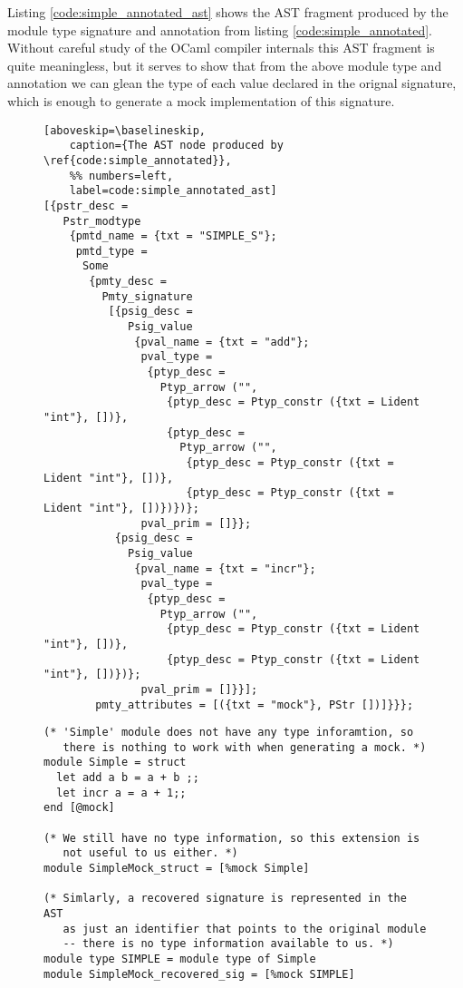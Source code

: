 Listing \ref{code:simple_annotated_ast} shows the AST fragment
produced by the module type signature and annotation from listing
\ref{code:simple_annotated}. Without careful study of the OCaml
compiler internals this AST fragment is quite meaningless, but it
serves to show that from the above module type and annotation we can
glean the type of each value declared in the orignal signature, which
is enough to generate a mock implementation of this signature.

\begin{figure}
\begin{lstlisting}[aboveskip=\baselineskip,
    caption={The AST node produced by \ref{code:simple_annotated}},
    %% numbers=left,
    label=code:simple_annotated_ast]
[{pstr_desc =
   Pstr_modtype
    {pmtd_name = {txt = "SIMPLE_S"};
     pmtd_type =
      Some
       {pmty_desc =
         Pmty_signature
          [{psig_desc =
             Psig_value
              {pval_name = {txt = "add"};
               pval_type =
                {ptyp_desc =
                  Ptyp_arrow ("",
                   {ptyp_desc = Ptyp_constr ({txt = Lident "int"}, [])},
                   {ptyp_desc =
                     Ptyp_arrow ("",
                      {ptyp_desc = Ptyp_constr ({txt = Lident "int"}, [])},
                      {ptyp_desc = Ptyp_constr ({txt = Lident "int"}, [])})})};
               pval_prim = []}};
           {psig_desc =
             Psig_value
              {pval_name = {txt = "incr"};
               pval_type =
                {ptyp_desc =
                  Ptyp_arrow ("",
                   {ptyp_desc = Ptyp_constr ({txt = Lident "int"}, [])},
                   {ptyp_desc = Ptyp_constr ({txt = Lident "int"}, [])})};
               pval_prim = []}}];
        pmty_attributes = [({txt = "mock"}, PStr [])]}}};
\end{lstlisting}
\end{figure}

\begin{figure}
\begin{lstlisting}[aboveskip=\baselineskip,
    caption={Elegant, but invalid, methods of specifying mock module},
    label=code:simple_annotated_bad]
(* 'Simple' module does not have any type inforamtion, so
   there is nothing to work with when generating a mock. *)
module Simple = struct
  let add a b = a + b ;;
  let incr a = a + 1;;
end [@mock]

(* We still have no type information, so this extension is
   not useful to us either. *)
module SimpleMock_struct = [%mock Simple]

(* Simlarly, a recovered signature is represented in the AST
   as just an identifier that points to the original module
   -- there is no type information available to us. *)
module type SIMPLE = module type of Simple
module SimpleMock_recovered_sig = [%mock SIMPLE]
\end{lstlisting}
\end{figure}

